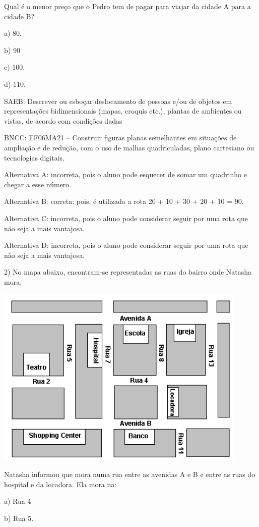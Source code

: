 Qual é o menor preço que o Pedro tem de pagar para viajar da cidade A
para a cidade B?

a) 80.

b) 90

c) 100.

d) 110.

SAEB: Descrever ou esboçar deslocamento de pessoas e/ou de objetos em
representações bidimensionais (mapas, croquis etc.), plantas de
ambientes ou vistas, de acordo com condições dadas

BNCC: EF06MA21 -- Construir figuras planas semelhantes em situações de
ampliação e de redução, com o uso de malhas quadriculadas, plano
cartesiano ou tecnologias digitais.

Alternativa A: incorreta, pois o aluno pode esquecer de somar um
quadrinho e chegar a esse número.

Alternativa B: correta: pois, é utilizada a rota 20 + 10 + 30 + 20 + 10
= 90.

Alternativa C: incorreta, pois o aluno pode considerar seguir por uma
rota que não seja a mais vantajosa.

Alternativa D: incorreta, pois o aluno pode considerar seguir por uma
rota que não seja a mais vantajosa.

2) No mapa abaixo, encontram-se representadas as ruas do bairro onde
Natasha mora.

\includegraphics[width=4.76042in,height=3.42708in]{./imgSAEB_6_MAT/media/image75.png}

Natasha informou que mora numa rua entre as avenidas A e B e entre as
ruas do hospital e da locadora. Ela mora na:

a) Rua 4

b) Rua 5.

